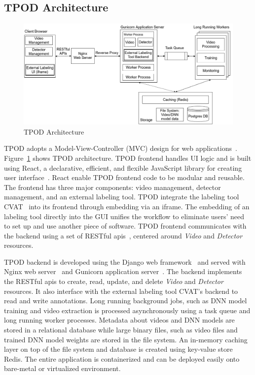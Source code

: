 \subsection{TPOD Architecture}

\begin{figure}[]
  \hspace{-.1in}
    \includegraphics[width=1.1\textwidth]{FIGS/tpod-arch}
    \caption{TPOD Architecture}
  \label{figs:tpod-arch}
\end{figure}

TPOD adopts a Model-View-Controller (MVC) design for web
applications~\cite{krasner1988description}. Figure~\ref{figs:tpod-arch} shows
TPOD architecture. TPOD frontend handles UI logic and is built using React, a
declarative, efficient, and flexible JavaScript library for creating user
interface~\cite{staff2016react}. React enable TPOD frontend code to be modular
and reusable. The frontend has three major components: video management,
detector management, and an external labeling tool. TPOD integrate the labeling
tool CVAT~\cite{cvat2019} into its frontend through embedding via an iframe. The
embedding of an labeling tool directly into the GUI unifies the workflow to
eliminate users' need to set up and use another piece of software. TPOD frontend
communicates with the backend using a set of RESTful
apis~\cite{richardson2008restful}, centered around \textit{Video} and
\textit{Detector} resources. 

TPOD backend is developed using the Django web
framework~\cite{holovaty2009definitive} and served with Nginx web
server~\cite{nedelcu2010nginx} and Gunicorn application
server~\cite{gunicorn2017http}. The backend implements the RESTful apis to
create, read, update, and delete \textit{Video} and \textit{Detector} resources.
It also interface with the external labeling tool CVAT's backend to read and
write annotations. Long running background jobs, such as DNN model training and
video extraction is processed asynchronously using a task queue and
long running worker processes. Metadata about videos and DNN models are stored
in a relational database while large binary files, such as video files and
trained DNN model weights are stored in the file system. An in-memory caching
layer on top of the file system and database is created using key-value store
Redis. The entire application is containerized and can be deployed easily onto
bare-metal or virtualized environment.

